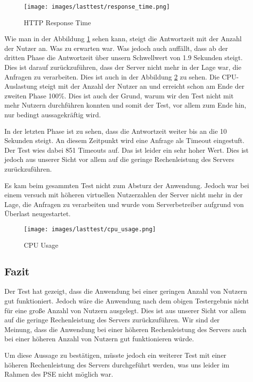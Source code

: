 \documentclass{qualitätssicherungsheft}
\begin{document}
\begin{figure}[!htp]
    \centering
        \texttt{[image: images/lasttest/response\_time.png]}
        \caption[center]{HTTP Response Time}
        \label{fig:http_response_time}
\end{figure}

Wie man in der Abbildung \ref{fig:http_response_time} sehen kann, steigt die Antwortzeit mit der Anzahl der Nutzer an. Was zu erwarten war. Was jedoch auch auffällt, dass ab der dritten Phase die Antwortzeit über unsern Schwellwert von 1.9 Sekunden steigt. Dies ist darauf zurückzuführen, dass der Server nicht mehr in der Lage war, die Anfragen zu verarbeiten. Dies ist auch in der Abbildung \ref{fig:cpu_usage} zu sehen. Die CPU-Auslastung steigt mit der Anzahl der Nutzer an und erreicht schon am Ende der zweiten Phase 100\%. Dies ist auch der Grund, warum wir den Test nicht mit mehr Nutzern durchführen konnten und somit der Test, vor allem zum Ende hin, nur bedingt aussagekräftig wird.

In der letzten Phase ist zu sehen, dass die Antwortzeit weiter bis an die 10 Sekunden steigt. An diesem Zeitpunkt wird eine Anfrage als Timeout eingestuft. Der Test wies dabei 851 Timeouts auf. Das ist leider ein sehr hoher Wert. Dies ist jedoch aus unserer Sicht vor allem auf die geringe Rechenleistung des Servers zurückzuführen. 

Es kam beim gesammten Test nicht zum Absturz der Anwendung.
Jedoch war bei einem versuch mit höheren virtuellen Nutzerzahlen der Server nicht mehr in der Lage, die Anfragen zu verarbeiten und wurde vom Serverbetreiber aufgrund von Überlast neugestartet.

\begin{figure}
    \centering
        \texttt{[image: images/lasttest/cpu\_usage.png]}
        \caption[center]{CPU Usage}
        \label{fig:cpu_usage}
\end{figure}

\subsection{Fazit}
Der Test hat gezeigt, dass die Anwendung bei einer geringen Anzahl von Nutzern gut funktioniert. Jedoch wäre die Anwendung nach dem obigen Testergebnis nicht für eine große Anzahl von Nutzern ausgelegt. Dies ist aus unserer Sicht vor allem auf die geringe Rechenleistung des Servers zurückzuführen. Wir sind der Meinung, dass die Anwendung bei einer höheren Rechenleistung des Servers auch bei einer höheren Anzahl von Nutzern gut funktionieren würde.

Um diese Aussage zu bestätigen, müsste jedoch ein weiterer Test mit einer höheren Rechenleistung des Servers durchgeführt werden, was uns leider im Rahmen des PSE nicht möglich war.
\end{document}
